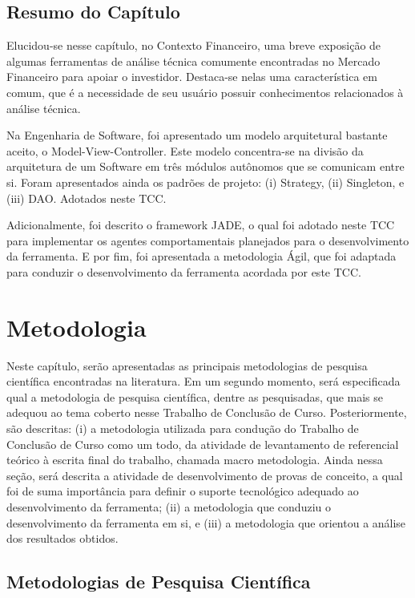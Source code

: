 \section{Resumo do Capítulo}

Elucidou-se nesse capítulo, no Contexto Financeiro, uma breve exposição de algumas ferramentas de análise técnica comumente encontradas no Mercado Financeiro para apoiar o investidor. Destaca-se nelas uma característica em comum, que é a necessidade de seu usuário possuir conhecimentos relacionados à análise técnica. 

Na Engenharia de Software, foi apresentado um modelo arquitetural bastante aceito, o Model-View-Controller. Este modelo concentra-se na divisão da arquitetura de um Software em três módulos autônomos que se comunicam entre si. Foram apresentados ainda os padrões de projeto: (i) Strategy, (ii) Singleton, e (iii) DAO. Adotados neste TCC. 

Adicionalmente, foi descrito o framework JADE, o qual foi adotado neste TCC para implementar os agentes comportamentais planejados para o desenvolvimento da ferramenta. E por fim, foi apresentada a metodologia Ágil, que foi adaptada para conduzir o desenvolvimento da ferramenta acordada por este TCC.

\newpage
\FloatBarrier
\chapter[METODOLOGIA]{Metodologia}

Neste capítulo, serão apresentadas as principais metodologias de pesquisa científica encontradas na literatura. Em um segundo momento, será especificada qual a metodologia de pesquisa científica, dentre as pesquisadas, que mais se adequou ao tema coberto nesse Trabalho de Conclusão de Curso. Posteriormente, são descritas: (i) a metodologia utilizada para condução do Trabalho de Conclusão de Curso como um todo, da atividade de levantamento de referencial teórico à escrita final do trabalho, chamada macro metodologia. Ainda nessa seção, será descrita a atividade de desenvolvimento de provas de conceito, a qual foi de suma importância para definir o suporte tecnológico adequado ao desenvolvimento da ferramenta; (ii) a metodologia que conduziu o desenvolvimento da ferramenta em si, e (iii) a metodologia que orientou a análise dos resultados obtidos.

\section{Metodologias de Pesquisa Científica}

